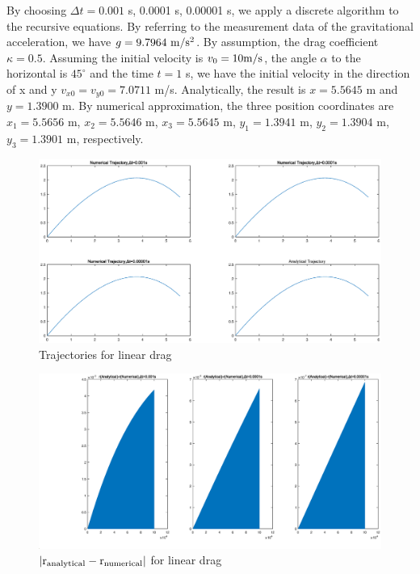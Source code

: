 \documentclass[12pt]{report}
\begin{document}
By choosing $\Delta t=0.001$  s, 0.0001 s, 0.00001 s, we apply a discrete algorithm to the recursive equations. By referring to the measurement data of the gravitational acceleration, we have $g=9.7964\ \rm{m/s^2}$. By assumption, the drag coefficient $\kappa=0.5$. Assuming the initial velocity is $v_0=10 \rm{m/s}$, the angle $\alpha$ to the horizontal is $45^\circ$ and the time $t=1$ s, we have the initial velocity in the direction of x and y $v_{x0}=v_{y0}=7.0711$ m/s. Analytically, the result is $x=5.5645$ m and $y=1.3900$ m. By numerical approximation, the three position coordinates are $x_1=5.5656$ m, $x_2=5.5646$ m, $x_3=5.5645$ m, $y_1=1.3941$ m, $y_2=1.3904$ m, $y_3=1.3901$ m, respectively.
\begin{figure}[H]
    \centering
    \includegraphics[width=1\linewidth]{2-1-1.eps}
    \caption{Trajectories for linear drag}
\end{figure}
\begin{figure}[H]
    \centering
    \includegraphics[width=1\linewidth]{2-1-2.eps}
    \caption{$\left| \rm{\bm{r}_{analytical}-\bm{r}_{numerical}}\right|$ for linear drag}
\end{figure}
\end{document}
